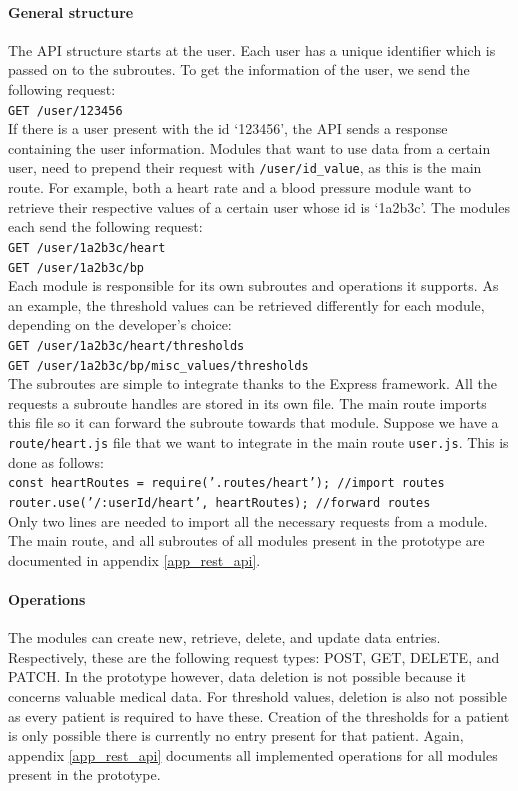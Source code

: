         \paragraph{General structure} The API structure starts at the user. Each user has a unique identifier which is passed on to the subroutes. To get the information of the user, we send the following request:\\
            \tab\texttt{GET /user/123456}\\
        If there is a user present with the id `123456', the API sends a response containing the user information. Modules that want to use data from a certain user, need to prepend their request with \texttt{/user/id\_value}, as this is the main route. For example, both a heart rate and a blood pressure module want to retrieve their respective values of a certain user whose id is `1a2b3c'. The modules each send the following request:\\
            \tab\texttt{GET /user/1a2b3c/heart}\\
            \tab\texttt{GET /user/1a2b3c/bp}\\
        Each module is responsible for its own subroutes and operations it supports. As an example, the threshold values can be retrieved differently for each module, depending on the developer's choice:\\
            \tab\texttt{GET /user/1a2b3c/heart/thresholds}\\
            \tab\texttt{GET /user/1a2b3c/bp/misc\_values/thresholds}\\
        The subroutes are simple to integrate thanks to the Express framework. All the requests a subroute handles are stored in its own file. The main route imports this file so it can forward the subroute towards that module. Suppose we have a \texttt{route/heart.js} file that we want to integrate in the main route \texttt{user.js}. This is done as follows:\\
            \tabsmall\texttt{const heartRoutes = require('.routes/heart'); //import routes}\\
            \tabsmall\texttt{router.use('/:userId/heart', heartRoutes); //forward routes}\\
        Only two lines are needed to import all the necessary requests from a module. The main route, and all subroutes of all modules present in the prototype are documented in appendix \ref{app_rest_api}.

        \paragraph{Operations}
        The modules can create new, retrieve, delete, and update data entries. Respectively, these are the following request types: POST, GET, DELETE, and PATCH. In the prototype however, data deletion is not possible because it concerns valuable medical data. For threshold values, deletion is also not possible as every patient is required to have these. Creation of the thresholds for a patient is only possible there is currently no entry present for that patient. Again, appendix \ref{app_rest_api} documents all implemented operations for all modules present in the prototype.

